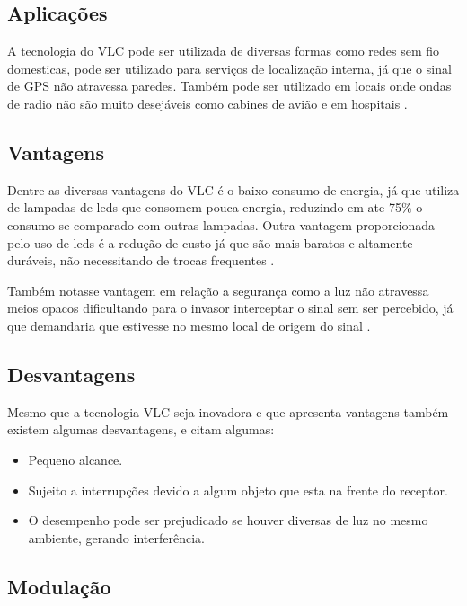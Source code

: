 \subsection{Aplicações}

A tecnologia do VLC pode ser utilizada de diversas formas como redes sem fio domesticas, pode ser utilizado para serviços de localização interna, já que o sinal de GPS não atravessa paredes. Também pode ser utilizado em locais onde ondas de radio não são muito desejáveis como cabines de avião e em hospitais \cite{matheus2017comunicaccao}. 

\subsection{Vantagens}

Dentre as diversas vantagens do VLC é o baixo consumo de energia, já que utiliza de lampadas de leds que consomem pouca energia, reduzindo em ate 75\% o consumo se comparado com outras lampadas. Outra vantagem proporcionada pelo uso de leds é a redução de custo já que são mais baratos e altamente duráveis, não necessitando de trocas frequentes \cite{matheus2017comunicaccao}.

Também notasse vantagem em relação a segurança como a luz não atravessa meios opacos dificultando para o invasor interceptar o sinal sem ser percebido, já que demandaria que estivesse no mesmo local de origem do sinal \cite{conceiccao2015comunicaccao}.

\subsection{Desvantagens}

Mesmo que a tecnologia VLC seja inovadora e que apresenta vantagens também existem algumas desvantagens, \citeauthor{matheus2017comunicaccao} e \citeauthor{conceiccao2015comunicaccao} citam algumas:

\begin{itemize}
  \item Pequeno alcance.
  \item Sujeito a interrupções devido a algum objeto que esta na frente do receptor.
  \item O desempenho pode ser prejudicado se houver diversas de luz no mesmo ambiente, gerando interferência.
\end{itemize}

\subsection{Modulação}

